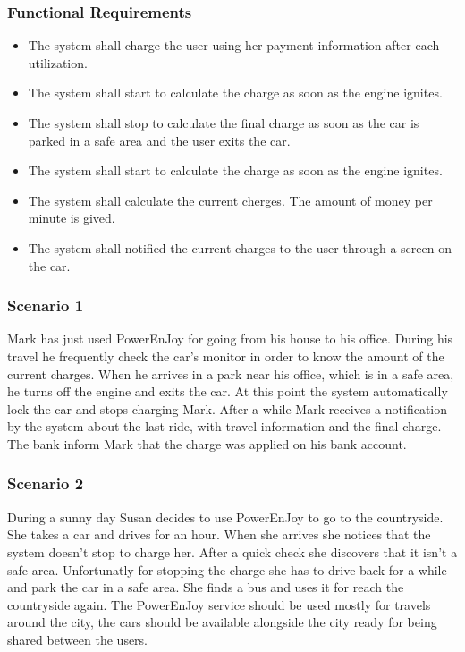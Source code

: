 \subsubsection{Functional Requirements}
\begin{itemize}
  \item The system shall charge the user using her payment information after each utilization.
  \item The system shall start to calculate the charge as soon as the engine ignites.
  \item The system shall stop to calculate the final charge as soon as the car is parked in a safe area and the user exits the car.%
  \item The system shall start to calculate the charge as soon as the engine ignites.
  \item The system shall calculate the current cherges. The amount of money per minute is gived.
  \item The system shall notified the current charges to the user through a screen on the car.
\end{itemize}

\subsubsection{Scenario 1}
Mark has just used PowerEnJoy for going from his house to his office. During his travel he frequently check the car's monitor in order to know the amount of the current charges. When he arrives in a park near his office, which is in a safe area, he turns off the engine and exits the car. At this point the system automatically lock the car and stops charging Mark. After a while Mark receives a notification by the system about the last ride, with travel information and the final charge. The bank inform Mark that the charge was applied on his bank account. 


\subsubsection{Scenario 2}
During a sunny day Susan decides to use PowerEnJoy to go to the countryside. She takes a car and drives for an hour. When she arrives she notices that the system doesn't stop to charge her. After a quick check she discovers that it isn't a safe area. Unfortunatly for stopping the charge she has to drive back for a while and park the car in a safe area. She finds a bus and uses it for reach the countryside again. The PowerEnJoy service should be used mostly for travels around the city, the cars should be available alongside the city ready for being shared between the users. 

